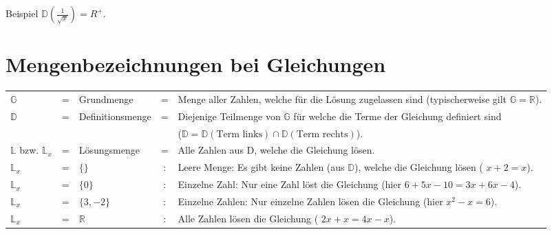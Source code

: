 Beispiel $\mathbb{D}(\frac{1}{\sqrt{x}}) = R^{+}$.

\section{Mengenbezeichnungen bei Gleichungen}
\begin{tabular}{lclcp{10cm}}
  $\mathbb{G}$ &=& Grundmenge &=& Menge aller Zahlen, welche für die Lösung zugelassen sind (typischerweise gilt $\mathbb{G}=\mathbb{R}$). \\
  $\mathbb{D}$ &=& Definitionsmenge &=& Diejenige Teilmenge von
                                        $\mathbb{G}$ für welche die Terme der Gleichung definiert sind\\
   & & & &  ($\mathbb{D}=\mathbb{D}(\textrm{Term links})\cap\mathbb{D}(\textrm{Term rechts})$).\\

   $\mathbb{L}$ bzw. $\mathbb{L}_x$ &=& Lösungsmenge &=& Alle Zahlen
  aus D, welche die Gleichung lösen.\\

  $\mathbb{L}_x$ &=&$\{\}$ &:& Leere Menge: Es gibt keine Zahlen
  (aus $\mathbb{D}$), welche die Gleichung lösen (\zB{} $x+2=x$).\\

  $\mathbb{L}_x$ &=&$\{0\}$ &:& Einzelne Zahl: Nur eine Zahl löst die
  Gleichung (hier \zB{} $6+5x-10=3x+6x-4$).\\

 $\mathbb{L}_x$ &=&$\{3, -2\}$ &:& Einzelne Zahlen: Nur einzelne
  Zahlen lösen die Gleichung (hier \zB{} $x^2-x=6$).\\

  $\mathbb{L}_x$ &=& $\mathbb{R}$ &:& Alle Zahlen lösen die Gleichung
  (\zB{} $2x+x=4x-x$).\\

\end{tabular}




